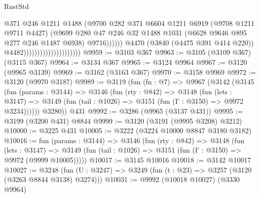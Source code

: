 \begin{lexlean}{RustStd}
\begin{coremodule}
{\begin{coremodule}
{{{{{{{{{{{{{{{{{{{{{{{{{{                                                      @371
                                                      @246
                                                      @1211
                                                      @1488
                                                      (@9700
                                                        @282
                                                        @371
                                                        @6604
                                                        @1211
                                                        @6919
                                                        (@9708 @1211 @9711 @4427)
                                                        (@9699
                                                          @280
                                                          @47
                                                          @246
                                                          @32
                                                          @1488
                                                          @1031
                                                          (@6628 @9646 @895 @277 @246 @1487 @6938)
                                                          @9716))))))
                                              @4470
                                              (@3840 (@4475 @391 @414 @220))
                                              @4482)))))))))))))))))))))
@9959 := @3103 @367
@9963 := @3105 (@3109 @367) (@3115 @367)
@9964 := @3134 @367
@9965 := @3124 @9964
@9967 := @3120 (@9965 @3139)
@9969 := @3162 (@3163 @367)
@9970 := @3158 @9969
@9972 := @3120 (@9970 @3187)
@9989 := @3119
    (fun (fn : @7) =>
    @9967
      (@3142
        (@3145
          (fun (params : @3144) =>
          @3146
            (fun (rty : @842) =>
            @3148
              (fun (lets : @3147) =>
              @3149 (fun (tail : @1026) => @3151 (fun (Γ : @3150) => @9972 @3234))))))
        @3280))
    @431
@9992 := @3286 (@9965 (@3137 @431))
@9995 := @3199 (@3200 @431) @8844
@9999 := @3120 (@3191 (@9995 @3208) @3212)
@10000 := @3225 @431
@10005 := @3222 (@3224 @10000 @8847 @3180 @3182)
@10016 := fun (params : @3144) =>
  @3146
    (fun (rty : @842) =>
    @3148
      (fun (lets : @3147) =>
      @3149 (fun (tail : @1026) => @3151 (fun (Γ : @3150) => @9972 (@9999 @10005)))))
@10017 := @3145 @10016
@10018 := @3142 @10017
@10027 := @3248
    (fun (U : @3247) => @3249 (fun (t : @23) => @3257 (@3120 (@3263 @8844 @3138) @3274)))
@10031 := @9992 (@10018 @10027) (@3330 @9964)
}}}}}}}}}}}}}}}}}}}}}}}}}}
\end{coremodule}}
\end{coremodule}
\end{lexlean}
